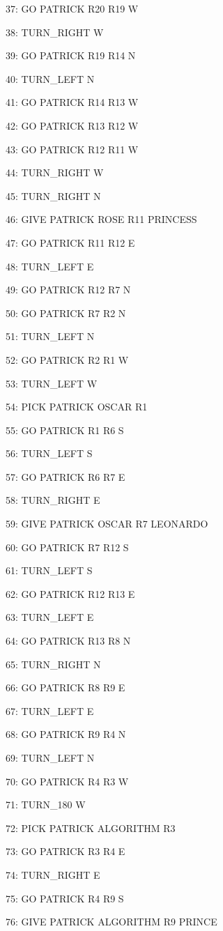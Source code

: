 \documentclass[11pt,a4paper]{article}
\begin{document}
\begin{multicols}{3}
       37: GO PATRICK R20 R19 W

       38: TURN\_RIGHT W

       39: GO PATRICK R19 R14 N

       40: TURN\_LEFT N

       41: GO PATRICK R14 R13 W

       42: GO PATRICK R13 R12 W

       43: GO PATRICK R12 R11 W

       44: TURN\_RIGHT W

       45: TURN\_RIGHT N

       46: GIVE PATRICK ROSE R11 PRINCESS

       47: GO PATRICK R11 R12 E

       48: TURN\_LEFT E

       49: GO PATRICK R12 R7 N

       50: GO PATRICK R7 R2 N

       51: TURN\_LEFT N

       52: GO PATRICK R2 R1 W

       53: TURN\_LEFT W

       54: PICK PATRICK OSCAR R1

       55: GO PATRICK R1 R6 S

       56: TURN\_LEFT S

       57: GO PATRICK R6 R7 E

       58: TURN\_RIGHT E

       59: GIVE PATRICK OSCAR R7 LEONARDO

       60: GO PATRICK R7 R12 S

       61: TURN\_LEFT S

       62: GO PATRICK R12 R13 E

       63: TURN\_LEFT E

       64: GO PATRICK R13 R8 N

       65: TURN\_RIGHT N

       66: GO PATRICK R8 R9 E

       67: TURN\_LEFT E

       68: GO PATRICK R9 R4 N

       69: TURN\_LEFT N

       70: GO PATRICK R4 R3 W

       71: TURN\_180 W

       72: PICK PATRICK ALGORITHM R3

       73: GO PATRICK R3 R4 E

       74: TURN\_RIGHT E

       75: GO PATRICK R4 R9 S

       76: GIVE PATRICK ALGORITHM R9 PRINCE

\end{multicols}
\end{document}
